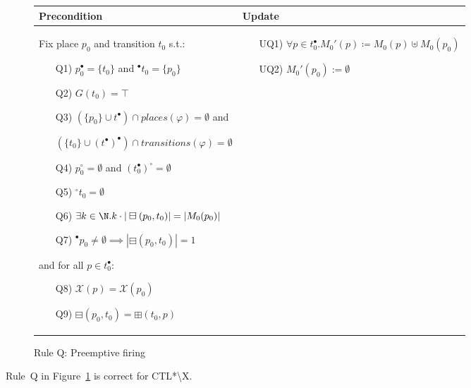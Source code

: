 \begin{figure}[h!]
    \vspace{5mm}

    \begin{adjustbox}{center}
        \begin{tabular}{|p{65mm}|p{60mm}|}
            \hline
            Precondition & Update \\ \hline
            Fix place $p_0$ and transition $t_0$ s.t.:
            \begin{itemize}[leftmargin=10mm]
                \item[Q1)] $p_0^\bullet = \{t_0\}$ and ${}^\bullet t_0 = \{p_0\}$
                \item[Q2)] $G(t_0) = \top$
                \item[Q3)] $(\{p_0\}\cup t^\bullet)\cap places(\varphi)=\emptyset$ and

                $(\{t_0\}\cup (t^\bullet)^\bullet)\cap transitions(\varphi)=\emptyset$

                \item[Q4)] $p_0^\circ=\emptyset$ and $(t_0^\bullet)^\circ=\emptyset$
                \item[Q5)] ${}^\circ t_0=\emptyset$
                \item[Q6)] $\exists k\in\N . k\cdot |\boxminus(p_0, t_0)| = |M_0(p_0)|$
                \item[Q7)] ${}^\bullet p_0\neq\emptyset\implies |\boxminus(p_0, t_0)|=1$
            \end{itemize}
            and for all $p\in t_0^\bullet$:
            \begin{itemize}[leftmargin=10mm]
                \item[Q8)] $\mathcal X(p) = \mathcal X(p_0) $
                \item[Q9)] $\boxminus(p_0, t_0) = \boxplus(t_0, p)$
            \end{itemize}
            &
            \begin{itemize}[leftmargin=10mm]
                \item[UQ1)] $\forall p \in t_0^\bullet . M_0'(p) \coloneqq M_0(p) \uplus M_0(p_0) $
                \item[UQ2)] $M_0'(p_0):=\emptyset$
            \end{itemize} \\ \hline
        \end{tabular}
    \end{adjustbox}
    \caption{Rule Q: Preemptive firing}
    \label{fig:preemptive-firing}
\end{figure}

\begin{theorem}
    Rule~Q in Figure~\ref{fig:preemptive-firing} is correct for CTL*\textbackslash X.
\end{theorem}